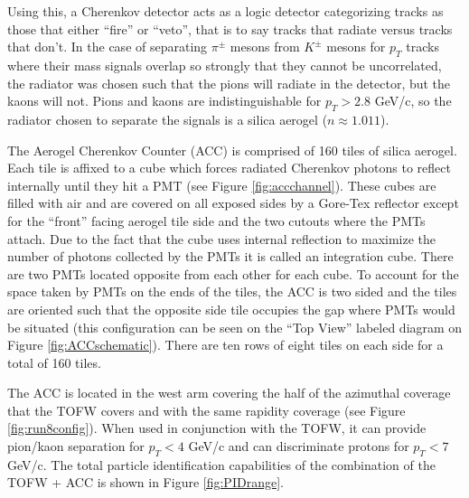 Using this, a Cherenkov detector acts as a logic detector categorizing tracks as those that either ``fire'' or ``veto'', that is to say tracks that radiate versus tracks that don't. In the case of separating $\pi^{\pm}$ mesons from $K^{\pm}$ mesons for $p_{T}$ tracks where their mass signals overlap so strongly that they cannot be uncorrelated, the radiator was chosen such that the pions will radiate in the detector, but the kaons will not. Pions and kaons are indistinguishable for $p_{T} > 2.8$ GeV/c, so the radiator chosen to separate the signals is a silica aerogel ($n \approx 1.011$).

The Aerogel Cherenkov Counter (ACC) is comprised of 160 tiles of silica aerogel. Each tile is affixed to a cube which forces radiated Cherenkov photons to reflect internally until they hit a PMT (see Figure \ref{fig:accchannel}). These cubes are filled with air and are covered on all exposed sides by a Gore-Tex reflector except for the ``front'' facing aerogel tile side and the two cutouts where the PMTs attach. Due to the fact that the cube uses internal reflection to maximize the number of photons collected by the PMTs it is called an integration cube. There are two PMTs located opposite from each other for each cube. To account for the space taken by PMTs on the ends of the tiles, the ACC is two sided and the tiles are oriented such that the opposite side tile occupies the gap where PMTs would be situated (this configuration can be seen on the ``Top View'' labeled diagram on Figure \ref{fig:ACCschematic}). There are ten rows of eight tiles on each side for a total of 160 tiles.

The ACC is located in the west arm covering the half of the azimuthal coverage that the TOFW covers and with the same rapidity coverage (see Figure \ref{fig:run8config}). When used in conjunction with the TOFW, it can provide pion/kaon separation for $p_{T} < 4$ GeV/c and can discriminate protons for $p_{T} < 7$ GeV/c.  The total particle identification capabilities of the combination of the TOFW + ACC is shown in Figure \ref{fig:PIDrange}.

